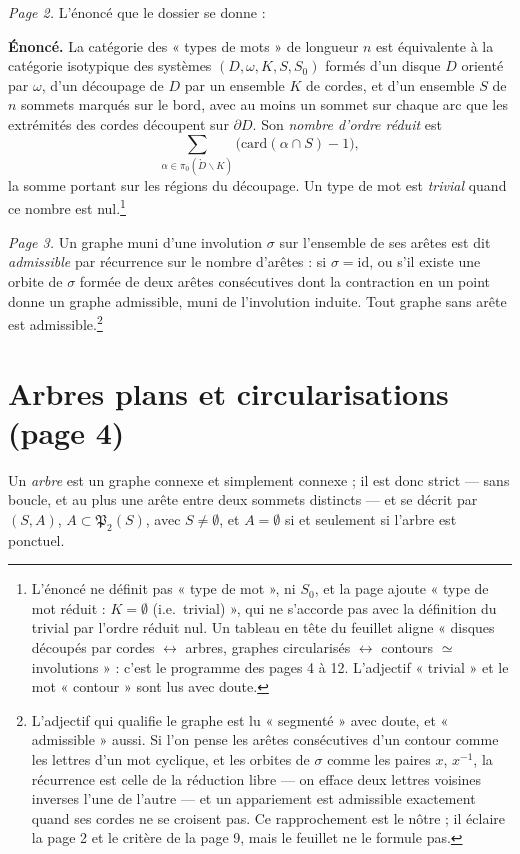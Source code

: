 \documentclass[11pt,a4paper]{article}
\begin{document}
\emph{Page 2.} L'énoncé que le dossier se donne :

\textbf{Énoncé.} La catégorie des « types de mots » de longueur $n$ est
équivalente à la catégorie isotypique des systèmes $(D, \omega, K, S, S_{0})$
formés d'un disque $D$ orienté par $\omega$, d'un découpage de $D$ par un
ensemble $K$ de cordes, et d'un ensemble $S$ de $n$ sommets marqués sur le bord,
avec au moins un sommet sur chaque arc que les extrémités des cordes découpent
sur $\partial D$. Son \emph{nombre d'ordre réduit} est
\[
\sum_{\alpha \in \pi_{0}(\mathring{D} \smallsetminus K)}
\bigl(\mathrm{card}(\alpha \cap S) - 1\bigr),
\]
la somme portant sur les régions du découpage. Un type de mot est
\emph{trivial} quand ce nombre est nul.\footnote{L'énoncé ne définit pas
« type de mot », ni $S_{0}$, et la page ajoute « type de mot réduit :
$K = \emptyset$ (i.e.\ trivial) », qui ne s'accorde pas avec la définition du
trivial par l'ordre réduit nul. Un tableau en tête du feuillet aligne « disques
découpés par cordes $\leftrightarrow$ arbres, graphes circularisés
$\leftrightarrow$ contours $\simeq$ involutions » : c'est le programme des pages
4 à 12. L'adjectif « trivial » et le mot « contour » sont lus avec doute.}

\emph{Page 3.} Un graphe muni d'une involution $\sigma$ sur l'ensemble de ses
arêtes est dit \emph{admissible} par récurrence sur le nombre d'arêtes : si
$\sigma = \mathrm{id}$, ou s'il existe une orbite de $\sigma$ formée de deux arêtes
consécutives dont la contraction en un point donne un graphe admissible, muni de
l'involution induite. Tout graphe sans arête est admissible.\footnote{L'adjectif
qui qualifie le graphe est lu « segmenté » avec doute, et « admissible » aussi.
Si l'on pense les arêtes consécutives d'un contour comme les lettres d'un mot
cyclique, et les orbites de $\sigma$ comme les paires $x$, $x^{-1}$, la
récurrence est celle de la réduction libre --- on efface deux lettres voisines
inverses l'une de l'autre --- et un appariement est admissible exactement quand
ses cordes ne se croisent pas. Ce rapprochement est le nôtre ; il éclaire la
page 2 et le critère de la page 9, mais le feuillet ne le formule pas.}

\section*{Arbres plans et circularisations (page 4)}

Un \emph{arbre} est un graphe connexe et simplement connexe ; il est donc
strict --- sans boucle, et au plus une arête entre deux sommets distincts --- et
se décrit par $(S, A)$, $A \subset \mathfrak{P}_{2}(S)$, avec $S \neq \emptyset$,
et $A = \emptyset$ si et seulement si l'arbre est ponctuel.
\end{document}
